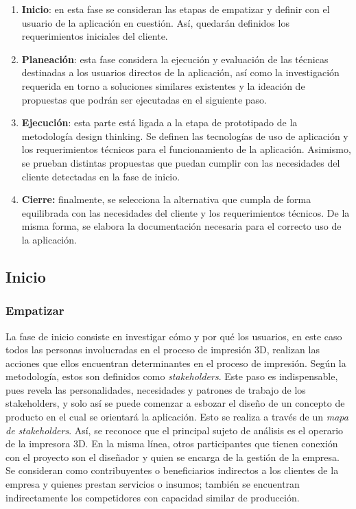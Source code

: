 \begin{enumerate}
\item \textbf{Inicio}: en esta fase se consideran las etapas de empatizar y definir con el usuario de la aplicación en cuestión. Así, quedarán definidos los requerimientos iniciales del cliente.
\item \textbf{Planeación}: esta fase considera la ejecución y evaluación de las técnicas destinadas a los usuarios directos de la aplicación, así como la investigación requerida en torno a soluciones similares existentes y la ideación de propuestas que podrán ser ejecutadas en el siguiente paso.
\item \textbf{Ejecución}: esta parte está ligada a la etapa de prototipado de la metodología design thinking. Se definen las tecnologías de uso de aplicación y los requerimientos técnicos para el funcionamiento de la aplicación. Asimismo, se prueban distintas propuestas que puedan cumplir con las necesidades del cliente detectadas en la fase de inicio.
\item \textbf{Cierre:} finalmente, se selecciona la alternativa que cumpla de forma equilibrada con las necesidades del cliente y  los requerimientos técnicos. De la misma forma, se elabora la documentación necesaria para el correcto uso de la aplicación.  
\end{enumerate}

\subsection{Inicio}

\subsubsection{Empatizar}

La fase de inicio consiste en investigar cómo y por qué los usuarios, en este caso todos las personas involucradas en el proceso de impresión 3D, realizan las acciones que ellos encuentran determinantes en el proceso de impresión. Según la metodología, estos son definidos como \textit{stakeholders}. Este paso es indispensable, pues revela las personalidades, necesidades y patrones de trabajo de los stakeholders, y solo así se puede comenzar a esbozar el diseño de un concepto de producto en el cual se orientará la aplicación. Esto se realiza a través de un \textit{mapa de stakeholders}. Así, se reconoce que el principal sujeto de análisis es el operario de la impresora 3D. En la misma línea, otros participantes que tienen conexión con el proyecto son el diseñador y quien se encarga de la gestión de la empresa. Se consideran como contribuyentes o beneficiarios indirectos a los clientes de la empresa y quienes prestan servicios o insumos; también se encuentran indirectamente los competidores con capacidad similar de producción.

